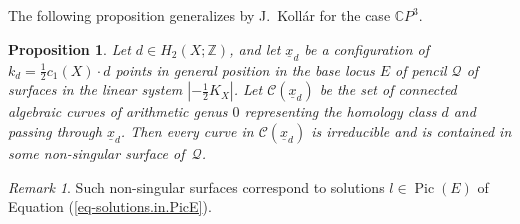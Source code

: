 \documentclass[10pt,a4paper]{article}
\numberwithin{equation}{section}
\theoremstyle{definition}
\theoremstyle{plain}
\newtheorem{proposition}[definition]{Proposition}
\theoremstyle{remark}
\newtheorem{remark}[definition]{Remark}
\newcommand{\Z}{\mathbb{Z}}
\newcommand{\cpp}{\mathbb{C}P^3}
\DeclareMathOperator{\Pic}{Pic}
\begin{document}
  The following proposition generalizes \cite[Proposition 3]{kollar2015examples} by J.~Koll\'ar for the case $\cpp$.

\begin{proposition} \label{Prop-Kollar}
Let $d\in H_2(X;\Z)$, and let  $\underline{x}_d$ be a configuration of\, $k_d=\tfrac{1}{2}c_1(X)\cdot d$ points in general position in the base locus $E$ of pencil $\mathcal{Q}$ of surfaces in the linear system $|-\frac{1}{2}K_X|$. Let $\mathcal{C}(\underline{x}_d)$ be the set of \textit{connected algebraic curves of arithmetic genus $0$ representing the homology class $d$ and passing through $\underline{x}_d$}. Then every curve in $\mathcal{C}(\underline{x}_d)$ is irreducible and is contained in some non-singular surface of\,  $\mathcal{Q}$.
 \end{proposition}
 
 \begin{remark}
     Such non-singular surfaces correspond to solutions $l\in \Pic(E)$ of Equation (\ref{eq-solutions.in.PicE}).
 \end{remark}
\end{document}
